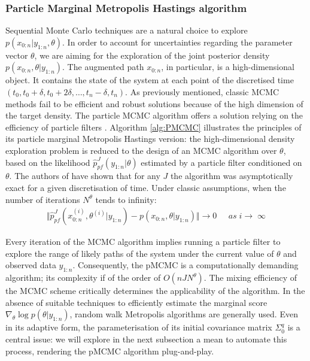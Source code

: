 \documentclass[a4paper,11pt,titlepage]{article}
\theoremstyle{plain} %
\begin{document}
\subsubsection{Particle Marginal Metropolis Hastings algorithm}
Sequential Monte Carlo techniques are a natural choice to explore $p(x_{0:n}|y_{1:n},\theta)$. In order to  account for  uncertainties regarding the parameter vector $\theta$, we are aiming for the exploration of the joint posterior density $p(x_{0:n},\theta|y_{1:n})$. 
The augmented path $x_{0:n}$, in particular, is a high-dimensional object. It contains the state of the system at each point of the discretised time $(t_0, t_{0}+\delta, t_{0}+2\delta,\dots,t_n-\delta,t_n)$. As previously mentioned,  classic MCMC methods fail to be efficient and robust solutions because of the high dimension of the target density. The particle MCMC algorithm  offers a solution relying on the efficiency of particle filters \citep{Andrieu2010}. Algorithm \ref{alg:PMCMC} illustrates the principles of its particle marginal Metropolis Hastings version: the high-dimensional density exploration problem is reduced to the design of an MCMC algorithm over $\theta$, based on the likelihood $\hat{p}^J_{pf}(y_{1:n}|\theta)$ estimated by a particle filter conditioned on $\theta$. The authors of \cite{Andrieu2010} have shown that for any $J$ the algorithm was asymptotically exact for a given discretisation of time. Under classic assumptions, when the number of iterations $N^{\theta}$ tends to infinity:
\begin{align}
	\Vert \hat{p}^J_{pf}(x^{(i)}_{0:n},\theta^{(i)}|y_{1:n}) -  p(x_{0:n},\theta|y_{1:n}) \Vert \rightarrow 0 \;\;\;\;\; as \; i\rightarrow \; \infty
\end{align}

Every iteration of the MCMC algorithm implies running a particle filter to explore the range of likely paths of the system under the current value of $\theta$ and observed data $y_{1:n}$. Consequently, the pMCMC is a computationally demanding algorithm; its complexity if of the order of $O(n J  N^{\theta})$. The mixing efficiency of the MCMC scheme critically determines the applicability of the algorithm. In the absence of suitable techniques to efficiently estimate the marginal score $\nabla_{\theta} \log p(\theta|y_{1:n})$, random walk Metropolis algorithms are generally used. Even in its adaptive form, the parameterisation of its initial covariance matrix $\Sigma^q_0$ is a central issue: we will explore in the next subsection a mean to automate this process, rendering the pMCMC algorithm plug-and-play. 
\end{document}
